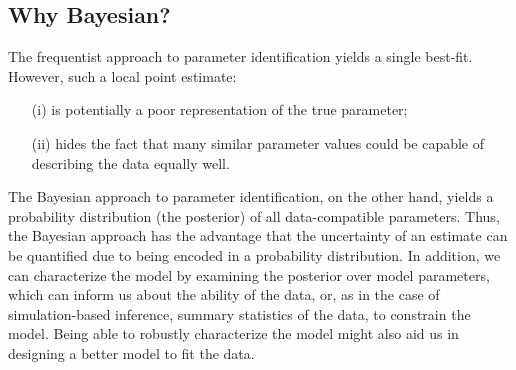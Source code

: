 \subsection{Why Bayesian?} 

The frequentist approach to parameter identification yields a single best-fit. However, such a local point estimate: 
\vspace{-0.5mm}
\begin{itemize}
    \item[(i)] is potentially a poor representation of the true parameter;
    \item[(ii)] hides the fact that many similar parameter values could be capable of describing the data equally well.
\end{itemize}

The Bayesian approach to parameter identification, on the other hand, yields a probability distribution (the posterior) of all data-compatible parameters. Thus, the Bayesian approach has the advantage that the uncertainty of an estimate can be quantified due to being encoded in a probability distribution. In addition, we can characterize the model by examining the posterior over model parameters, which can inform us about the ability of the data, or, as in the case of simulation-based inference, summary statistics of the data, to constrain the model. Being able to robustly characterize the model might also aid us in designing a better model to fit the data.


